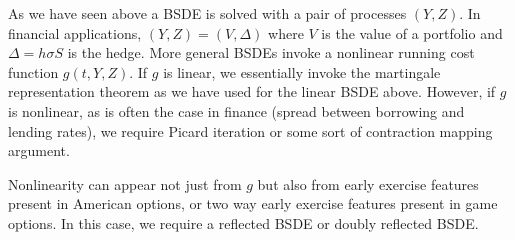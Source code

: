 \documentclass{amsart}
\theoremstyle{definition}
\theoremstyle{remark}
\numberwithin{equation}{section}
\begin{document}
As we have seen above a BSDE is solved with a pair of processes $(Y, Z)$.
In financial applications, $(Y, Z) = (V, \Delta)$ where $V$ is the value of a portfolio and $\Delta = h \sigma S$ is the hedge. 
More general BSDEs invoke a nonlinear running cost function $g(t, Y, Z)$. 
If $g$ is linear, we essentially invoke the martingale representation theorem as we have used for the linear BSDE above. 
However, if $g$ is nonlinear, as is often the case in finance (spread between borrowing and lending rates), we require Picard iteration or some sort of contraction mapping argument. 

Nonlinearity can appear not just from $g$ but also from early exercise features present in American options, or two way early exercise features present in game options.
In this case, we require a reflected BSDE or doubly reflected BSDE. 
\end{document}
